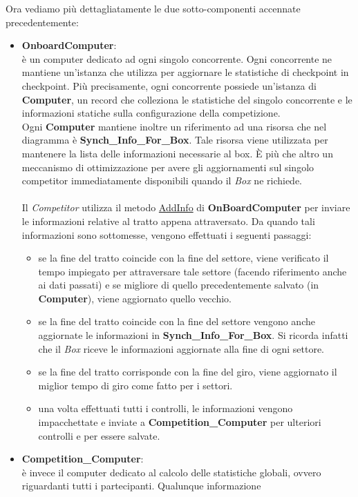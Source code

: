 Ora vediamo pi\`{u} dettagliatamente le due sotto-componenti accennate precedentemente:
\begin{itemize}
\item \textbf{OnboardComputer}:\\
\`{e} un computer dedicato ad ogni singolo concorrente. Ogni concorrente ne mantiene un'istanza che utilizza
per aggiornare le statistiche di checkpoint in checkpoint. Pi\`{u} precisamente, ogni concorrente possiede un'istanza di \textbf{Computer}, un record
che colleziona le statistiche del singolo concorrente e le informazioni statiche sulla configurazione della competizione.\\
Ogni \textbf{Computer} mantiene inoltre un riferimento ad una risorsa che nel diagramma \`{e} \textbf{Synch\_Info\_For\_Box}. Tale risorsa
viene utilizzata per mantenere la lista delle informazioni necessarie al box. \`{E} pi\`{u} che altro un meccanismo di ottimizzazione per avere
gli aggiornamenti sul singolo competitor immediatamente disponibili quando il \emph{Box} ne richiede.\\\\
Il \emph{Competitor} utilizza il metodo \underline{AddInfo} di \textbf{OnBoardComputer} 
per inviare le informazioni relative al tratto appena attraversato. Da quando tali informazioni sono sottomesse, vengono effettuati i seguenti
passaggi:
\begin{itemize}
\item se la fine del tratto coincide con la fine del settore, viene verificato il tempo impiegato per attraversare tale settore (facendo riferimento
anche ai dati passati) e se migliore di quello precedentemente salvato (in \textbf{Computer}), viene aggiornato quello vecchio.
\item se la fine del tratto coincide con la fine del settore vengono anche aggiornate le informazioni in \textbf{Synch\_Info\_For\_Box}. 
Si ricorda infatti che il \emph{Box} riceve le informazioni aggiornate alla fine di ogni settore.
\item se la fine del tratto corrisponde con la fine del giro, viene aggiornato il miglior tempo di giro come fatto per i settori.
\item una volta effettuati tutti i controlli, le informazioni vengono impacchettate e inviate a \textbf{Competition\_Computer} per ulteriori
controlli e per essere salvate.
\end{itemize}
\item \textbf{Competition\_Computer}:\\
\`{e} invece il computer dedicato al calcolo delle statistiche globali, ovvero riguardanti tutti i partecipanti. Qualunque informazione 

\end{itemize}
